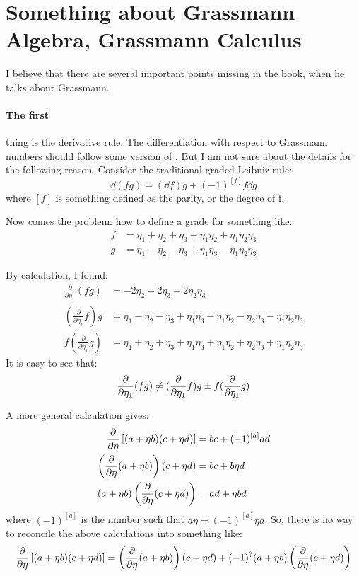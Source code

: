 \documentclass{article}
\begin{document}
\section{Something about Grassmann Algebra, Grassmann Calculus}

I believe that there are several important points missing in the book, when he
talks about Grassmann.

\paragraph{The first} thing is the derivative rule. The differentiation with respect to
Grassmann numbers should follow some version of . But
I am not sure about the details for the following reason. Consider the
traditional graded Leibniz rule:
\begin{equation}
    \dd (fg) = (\dd f) g + (-1)^{[f]} f\dd g
\end{equation}
where $[f]$ is something defined as the parity, or the degree of f.

Now comes the problem: how to define a grade for something like:
\begin{align}
    f &= \eta_1 +\eta_2 + \eta_3 + \eta_1\eta_2 +\eta_1\eta_2\eta_3 \\
    g &= \eta_1 -\eta_2 -\eta_3 + \eta_1\eta_3 - \eta_1\eta_2\eta_3
\end{align}


By calculation, I found:
\begin{align}
    \frac{\partial }{\partial \eta_1}(fg) &= -2\eta_2-2\eta_3-2\eta_2\eta_3 \\
    (\frac{\partial }{\partial \eta_1}f)g &=
        \eta_1-\eta_2-\eta_3+\eta_1\eta_3-\eta_1\eta_2-\eta_2\eta_3-\eta_1\eta_2\eta_3
    \\
    f( \frac{\partial }{\partial \eta_1}g) &=
        \eta_1+\eta_2+\eta_3+ \eta_1\eta_3 +\eta_1\eta_2+\eta_2\eta_3
        +\eta_1\eta_2\eta_3
\end{align}
It is easy to see that:
\begin{equation}
    \pdv{\eta_1}(fg) \neq (\pdv{\eta_1}f)g \pm f(\pdv{\eta_1} g)
\end{equation}

A more general calculation gives:
\begin{align}
    \pdv{\eta}\left[ (a+\eta b)(c+\eta d) \right] &= bc + (-1)^{[a]} ad \\
    \left(\pdv{\eta}(a+\eta b)\right) (c+\eta d) &= bc + b\eta d \\
    (a+\eta b)\left(\pdv{\eta}(c+\eta d)\right) &= ad + \eta bd
\end{align}
where $(-1)^{[a]}$ is the number such that $a\eta = (-1)^{[a]}\eta a$. So, there
is no way to reconcile the above calculations into something like:
\begin{align*}
    \pdv{\eta}\left[ (a+\eta b)(c+\eta d) \right] = 
    \left(\pdv{\eta}(a+\eta b)\right) (c+\eta d)  
    + (-1)^?  (a+\eta b)\left(\pdv{\eta}(c+\eta d)\right)
\end{align*}
\end{document}

